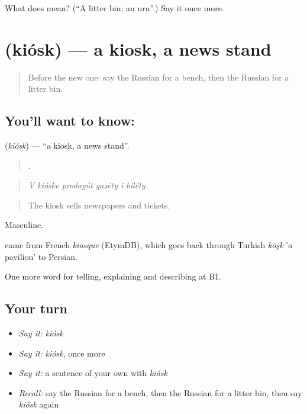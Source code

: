 \begin{tcolorbox}[breakable,colback=teal!4,colframe=teal!35!black,title={Before you move on}]
What does  mean? (\textquotedblleft{}A litter bin; an urn\textquotedblright{}.) Say it once more.
\end{tcolorbox}
\section[\texorpdfstring{\ru{киоск} (kiósk)}{киоск (kiósk)}]{ (kiósk) — a kiosk, a news stand}

\label{lesson:RU-C445-kiosk}



\begin{quote}
Before the new one: say the Russian for a bench, then the Russian for a litter bin.
\end{quote}

\subsection*{You'll want to know: }
\textbf{} (\emph{kiósk}) — \textquotedblleft{}a kiosk, a news stand\textquotedblright{}.

\begin{quote}
     .
\end{quote}

\begin{quote}
\emph{V kióske prodayút gazéty i biléty.}
\end{quote}

\begin{quote}
The kiosk sells newspapers and tickets.
\end{quote}

Masculine.

\begin{cousinweb}
\emph{} came from French \emph{kiosque} (EtymDB), which goes back through Turkish \emph{köşk} 'a pavilion' to Persian.
\end{cousinweb}

\begin{grammarlens}[title={What you've built}]
One more word for telling, explaining and describing at B1.
\end{grammarlens}

\subsection*{Your turn}
\begin{itemize}
\raggedright
  \item \emph{Say it:} \emph{kiósk}
  \item \emph{Say it:} \emph{kiósk}, once more
  \item \emph{Say it:} a sentence of your own with \emph{kiósk}
  \item \emph{Recall:} say the Russian for a bench, then the Russian for a litter bin, then say \emph{kiósk} again
\end{itemize}


